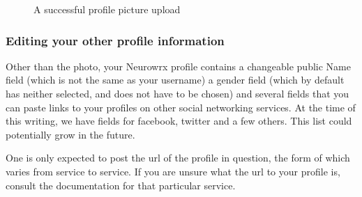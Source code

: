 \documentclass[10pt]{article}
\begin{document}
\begin{figure}[h]
    \centering
    \qquad
    \caption{A successful profile picture upload}
    \label{avatarUp}
\end{figure}

\subsubsection{Editing your other profile information}

\begin{flushleft}
Other than the photo, your Neurowrx profile contains a changeable public Name field (which is not the same as your username) a gender field (which by default has neither selected, and does not have to be chosen) and several fields that you can paste links to your profiles on other social networking services.  At the time of this writing, we have fields for facebook, twitter and a few others.  This list could potentially grow in the future.  
\end{flushleft}

\begin{flushleft}
One is only expected to post the url of the profile in question, the form of which varies from service to service.  If you are unsure what the url to your profile is, consult the documentation for that particular service. 
\end{flushleft}
\end{document}
